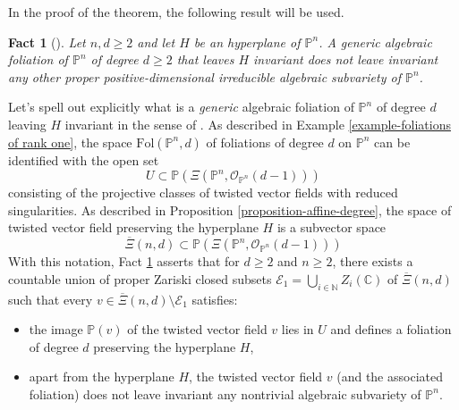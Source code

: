\documentclass[12pt]{amsart}
\renewcommand{\P}{\mathbb{P}}
\theoremstyle{definition}
\theoremstyle{plain}
\newtheorem{fact}[definition]{Fact}
\theoremstyle{exampstyle}
\theoremstyle{exampstyle}\newtheorem{thmxbis}{Theorem}
\numberwithin{equation}{section}
\theoremstyle{remark}
\begin{document}
In the proof of the theorem, the following result will be used. 

\begin{fact}[{\citep[Theorem 4.3]{Coutinho}}]\label{theorem-Coutinho}
Let $n,d \geq 2$ and let $H$ be an hyperplane of $\P^n$. A {\em generic} algebraic foliation of $\P^n$ of {\em degree $d \geq 2$} that leaves $H$ invariant does not leave invariant any other proper positive-dimensional  irreducible algebraic  subvariety of $\P^n$.  
\end{fact} 

Let's spell out explicitly what is a {\em generic} algebraic foliation of $\P^n$ of degree $d$ leaving $H$ invariant in the sense of \cite{Coutinho,Pereira-JEMS}. As described in Example \ref{example-foliations of rank one}, the space $\mathrm{Fol}(\P^n,d)$ of foliations of degree $d$ on $\P^n$ can be identified with the open set 
$$U \subset \P(\Xi(\P^n, \mathcal O_{\P^n}(d-1)))$$
consisting of the projective classes of twisted vector fields with reduced singularities. As described in Proposition \ref{proposition-affine-degree}, the space of twisted vector field preserving the hyperplane $H$ is a subvector space 
$$\overline{\Xi}(n,d) \subset \P(\Xi(\P^n, \mathcal O_{\P^n}(d-1))) $$ 
With this notation, Fact \ref{theorem-Coutinho} asserts that for $d \geq 2$ and $n \geq 2$, there exists a countable union of proper Zariski closed subsets $\mathcal E_1 = \bigcup_{i \in \mathbb{N}} Z_i(\mathbb{C})$ of $\overline{\Xi}(n,d)$ such that every $v \in \overline{\Xi}(n,d) \setminus \mathcal E_1$ satisfies: 
\begin{itemize} 
\item[(a)] the image $\P(v)$ of the twisted vector field $v$ lies in $U$ and defines a foliation of degree $d$ preserving the hyperplane $H$, 
\item[(b)] apart from the hyperplane $H$, the twisted vector field $v$ (and the associated foliation) does not leave invariant any nontrivial algebraic subvariety of $\P^n$. 
\end{itemize} 
 
\end{document}
